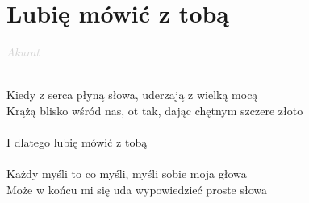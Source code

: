 \documentclass[a5paper, 10pt]{book}
\begin{document}
\section{Lubię mówić z tobą}\textcolor{lightgray}{\textit{Akurat}}\\~\\
\begin{minipage}[t]{0.8\textwidth}
  Kiedy z serca płyną słowa, uderzają z wielką mocą\\
  Krążą blisko wśród nas, ot tak, dając chętnym szczere złoto\\
  \\
  \hspace*{5mm}I dlatego lubię mówić z tobą\\
  \\
  Każdy myśli to co myśli, myśli sobie moja głowa\\
  Może w końcu mi się uda wypowiedzieć proste słowa\\
\end{minipage}
\end{document}
